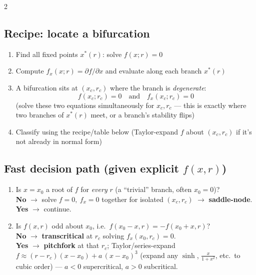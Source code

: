 \documentclass[10pt]{article}
\begin{document}
\begin{multicols}{2}
\subsection*{Recipe: locate a bifurcation}
\begin{enumerate}[nosep, leftmargin=1.3em]
    \item Find all fixed points $x^*(r)$: solve $f(x;r)=0$
    \item Compute $f_x(x;r)=\partial f/\partial x$ and evaluate along each branch $x^*(r)$
    \item A bifurcation sits at $(x_c,r_c)$ where the branch is \emph{degenerate}:
    \[
        f(x_c;r_c)=0 \quad\text{and}\quad f_x(x_c;r_c)=0
    \]
    (solve these two equations simultaneously for $x_c,r_c$ --- this is exactly where two branches of $x^*(r)$ meet, or a branch's stability flips)
    \item Classify using the recipe/table below (Taylor-expand $f$ about $(x_c,r_c)$ if it's not already in normal form)
\end{enumerate}

\subsection*{Fast decision path (given explicit $f(x,r)$)}
\begin{enumerate}[nosep, leftmargin=1.3em]
    \item Is $x=x_0$ a root of $f$ for \emph{every} $r$ (a ``trivial'' branch, often $x_0=0$)?\\
    \textbf{No} $\to$ solve $f=0,\ f_x=0$ together for isolated $(x_c,r_c)$ $\to$ \textbf{saddle-node}.\\
    \textbf{Yes} $\to$ continue.
    \item Is $f(x,r)$ odd about $x_0$, i.e.\ $f(x_0-x,r)=-f(x_0+x,r)$?\\
    \textbf{No} $\to$ \textbf{transcritical} at $r_c$ solving $f_x(x_0,r_c)=0$.\\
    \textbf{Yes} $\to$ \textbf{pitchfork} at that $r_c$; Taylor/series-expand $f\approx (r-r_c)(x-x_0) + a\,(x-x_0)^3$ (expand any $\sinh$, $\tfrac{x}{1+x^2}$, etc.\ to cubic order) --- $a<0$ supercritical, $a>0$ subcritical.
\end{enumerate}


\end{multicols}
\end{document}
